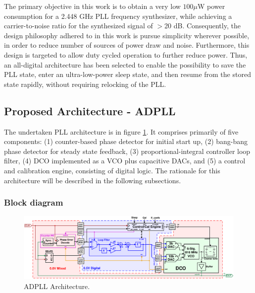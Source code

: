 
The primary objective in this work is to obtain a very low $100\mu$W power consumption for a 2.448 GHz PLL frequency synthesizer, while achieving a carrier-to-noise ratio for the synthesized signal of $>$20 dB. Consequently, the design philosophy adhered to in this work is pursue simplicity wherever possible, in order to reduce number of sources of power draw and noise. Furthermore, this design is targeted to allow duty cycled operation to further reduce power. Thus, an all-digital architecture has been selected to enable the possibility to save the PLL state, enter an ultra-low-power sleep state, and then resume from the stored state rapidly, without requiring relocking of the PLL. 

\subsection{Proposed Architecture - ADPLL}\label{pll_arch}
	The undertaken PLL architecture is in figure \ref{fig:pll_arch}. It comprises primarily of five components: (1) counter-based phase detector for initial start up, (2) bang-bang phase detector for steady state feedback, (3) proportional-integral controller loop filter, (4) DCO implemented as a VCO plus capacitive DACs, and (5) a control and calibration engine, consisting of digital logic. The rationale for this architecture will be described in the following subsections.
	\subsubsection{Block diagram}
			\begin{figure}[htb!]
		        \centering
		        \includegraphics[width=1\textwidth, angle=0]{./figs/design/pll_master_arch_final}
			    \caption{ADPLL Architecture.}
			    \label{fig:pll_arch}
			\end{figure}

